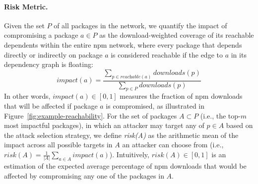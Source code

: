 \paragraph{Risk Metric.}
Given the set $P$ of all packages in the network, we quantify the impact of compromising a package $a\in P$ as the download-weighted coverage of its reachable dependents within the entire npm network, where every package that depends directly or indirectly on package $a$ is considered reachable if the edge to $a$ in its dependency graph is floating:
\begin{equation}
\label{eq:impact}
    \textit{impact}(a)=\frac{\sum_{p \in \textit{reachable}(a)}\textit{downloads}(p)}{\sum_{p \in P}{\textit{downloads}(p)}}
\end{equation}
In other words, $\textit{impact}(a) \in [0, 1]$ measures the fraction of npm downloads that will be affected if package $a$ is compromised, as illustrated in Figure~\ref{fig:example-reachability}.
For the set of packages $A\subset P$ (i.e., the top-$m$ most impactful packages), in which an attacker may target any of $p \in A$ based on the attack selection strategy, we define \textit{risk(A)} as the arithmetic mean of the impact across all possible targets in $A$ an attacker can choose from (i.e., $\textstyle\textit{risk}(A)=\frac{1}{{|A|}}{\sum_{a \in A} \textit{impact}(a)}$).
Intuitively, $risk(A) \in [0, 1]$ is an estimation of the expected average percentage of npm downloads that would be affected by compromising any one of the packages in $A$.  

